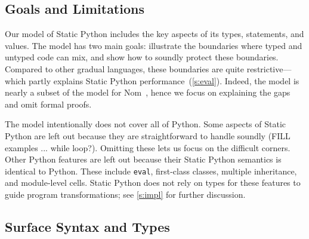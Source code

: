 \documentclass[english,cleveref,submission]{programming}
\newcommand{\SP}{Static Python}
\newcommand{\code}[1]{\texttt{#1}}
\begin{document}
\subsection{Goals and Limitations}

Our model of \SP{} includes the key aspects of its types,
statements, and values.
The model has two main goals:
illustrate the boundaries where typed and untyped code can mix,
and show how to soundly protect these boundaries.
Compared to other gradual languages, these boundaries are quite restrictive---which
partly explains \SP{} performance~(\cref{s:eval}).
Indeed, the model is nearly a subset of the model for Nom~\cite{mt-oopsla-2021},
hence we focus on explaining the gaps and omit formal proofs.

The model intentionally does not cover all of Python.
Some aspects of \SP{} are left out because they are straightforward to
handle soundly (FILL examples ... while loop?).
Omitting these lets us focus on the difficult corners.
Other Python features are left out because their \SP{} semantics is identical
to Python.
These include \code{eval}, first-class classes, multiple inheritance, and module-level cells.
\SP{} does not rely on types for these features to guide program transformations;
see \cref{s:impl} for further discussion.


\subsection{Surface Syntax and Types}
\end{document}
